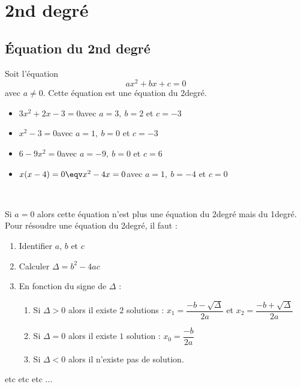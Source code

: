 \def\Classe{2\nde}
\def\Titre{Fonctions et équations du 2nd degré}


\DoTitle
\printtoc
\section{2nd degré}
\subsection{Équation du 2nd degré}
 Soit l'équation $$\boxed{ax^2+bx+c=0}$$ avec $a\neq 0$. Cette équation est une équation du 2\nd degré.
\hligne
\exemple
\begin{itemize}
  \item $3x^2+2x-3=0$\qquad avec $a=3,~b=2$ et $c=-3$
  \item $x^2-3=0$\qquad avec $a=1,~b=0$ et $c=-3$
  \item $6-9x^2=0$\qquad avec $a=-9,~b=0$ et $c=6$
  \item $x(x-4)=0\eqv x^2-4x=0$\qquad avec $a=1,~b=-4$ et $c=0$
\end{itemize}

~

\remarque Si $a=0$ alors cette équation n'est plus une équation du 2\nd degré mais du 1\er degré.
\hligne
\methode Pour résoudre une équation du 2\nd degré, il faut :
\begin{enumerate}
  \item Identifier $a$, $b$ et $c$
  \item Calculer $\Delta=b^2-4ac$
  \item En fonction du signe de $\Delta$ :
    \begin{enumerate}
      \item Si $\Delta>0$ alors il existe $2$ solutions : $\boxed{x_1=\dfrac{-b-\sqrt{\Delta}}{2a}}$ et $\boxed{x_2=\dfrac{-b+\sqrt{\Delta}}{2a}}$
      \item Si $\Delta=0$ alors il existe $1$ solution : $\boxed{x_0=\dfrac{-b}{2a}}$
      \item Si $\Delta<0$ alors il n'existe pas de solution.
    \end{enumerate}
\end{enumerate}

\hligne

etc etc etc ... 


